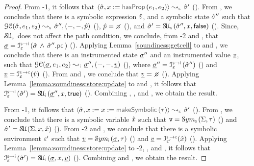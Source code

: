 \begin{proof}
\noindent {}
From \hyp{1}, it follows that $\absbsemrule{\sstate, \jvar := \hasfield(\jsilexpr_1, \jsilexpr_2)}{\sstate'}{\symbolic}$ (). 
From , we conclude that there is a symbolic expression $\hat{v}$, and a symbolic state $\hat{\sigma}''$ such that 
$\absgetcellrule{\symbolic}{\sstate, \jsilexpr_1, \jsilexpr_2}{\sstate'', (-, -, \sexprp)}$ (), $\sexprp = \none$ (), 
and $\sstate' = \stupdt{\symbolic}(\sstate'', \jvar, \jfalse)$ (). 
Since, $\stupdt{\symbolic}$ does not affect the path condition, we conclude, from \hyp{2} and , that
$\istate = \interpret{\symbinst}{\senv}(\sstate \, \wedge \, \sstate''.\pcsel)$ ().
Applying Lemma~\ref{soundiness:getcell} to  and , we conclude that
there is an instrumented state $\underline{\sigma}''$ and an instrumented value $\underline{v}$, such that 
$\absgetcellrule{\instrumented}{\istate, \jsilexpr_1, \jsilexpr_2}{\istate'', (-, -, \ival)}$ (), 
where $\istate'' = \interpret{\symbinst}{\senv}(\sstate'')$ () and $\ival = \interpret{\symbconc}{\senv}(\sexprv)$ (). 
 From  and , we conclude that $\ival = \none$ (). 
Applying Lemma~\ref{lemma:soundiness:store:update} to  and , it follows
that  $\interpret{\symbinst}{\senv}(\sstate') = \stupdt{\instrumented}(\istate'', \jvar, \jtrue)$ ().
Combining , , and , we obtain the result. 
\vspace{5pt} 

\noindent {}
From \hyp{1}, it follows that $\absbsemrule{\sstate, \jvar := \jvar := \makesymbolic(\jtype)}{\sstate'}{\symbolic}$ (). 
From , we conclude that there is a symbolic variable $\hat{x}$ such that 
$\absval = \absmakesymbolicrule{\symbolic}{\absstate, \jtype}$ () and $\hat{\sigma}' = \mathcal{S\!U}_{}(\Sigma, x, \hat{x})$ (). 
From \hyp{2} and , we conclude that there is a symbolic environment $\varepsilon'$ such that
$\ival = \absmakesymbolicrule{\instrumented}{\istate, \jtype}$ () and $\ival = \interpret{\symbconc}{\senv'}(\svar)$ (). 
Applying Lemma~\ref{lemma:soundiness:store:update} to \hyp{2}, , and , it follows that 
 $\interpret{\symbinst}{\senv}(\sstate') = \stupdt{\instrumented}(\istate, \jvar, \ival)$ ().
 Combining  and , we obtain the result.  
\end{proof}

